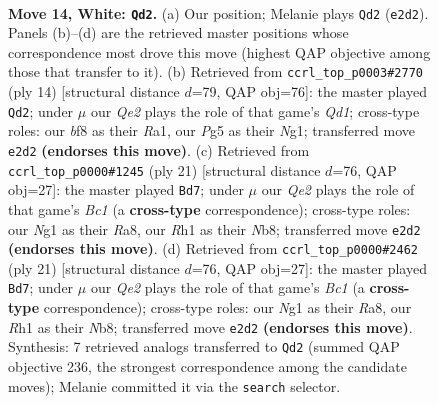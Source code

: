 \documentclass[11pt]{article}
\begin{document}
\clearpage

\begin{figure}[p]\centering
\begin{subfigure}{0.46\textwidth}\centering
\resizebox{\linewidth}{!}{%
\newchessgame
\chessboard[
  setfen={r1b1kb1r/pp1n1p2/4p3/3pP1Pp/3q4/8/PP2Q1PP/R1BK1NNR w kq - 1 14},
  showmover=false,
  pgfstyle=straightmove, color=movearrow, markmove={e2-d2}
]}
\caption{}
\end{subfigure}\hfill
\begin{subfigure}{0.46\textwidth}\centering
\resizebox{\linewidth}{!}{%
\newchessgame
\chessboard[
  setfen={rnb1kb1r/pp3pp1/4pn1p/q1P5/4N2B/8/PPP2PPP/R2QKBNR w KQkq - 1 8},
  showmover=false,
  pgfstyle=straightmove, color=movearrow, markmove={d1-d2}
]}
\caption{}
\end{subfigure}
\\[4pt]
\begin{subfigure}{0.46\textwidth}\centering
\resizebox{\linewidth}{!}{%
\newchessgame
\chessboard[
  setfen={rnb1k1r1/ppq1np1Q/4p3/3pP3/5P2/P1p5/2P1N1PP/R1B1KB1R b KQq - 0 11},
  showmover=false,
  pgfstyle=straightmove, color=movearrow, markmove={c8-d7}
]}
\caption{}
\end{subfigure}\hfill
\begin{subfigure}{0.46\textwidth}\centering
\resizebox{\linewidth}{!}{%
\newchessgame
\chessboard[
  setfen={rnb1k1r1/ppq1np1Q/4p3/3pP3/5P2/P1p5/2P1N1PP/R1B1KB1R b KQq - 0 11},
  showmover=false,
  pgfstyle=straightmove, color=movearrow, markmove={c8-d7}
]}
\caption{}
\end{subfigure}
\caption{\textbf{Move 14, White: \texttt{Qd2}.} (a) Our position; Melanie plays \texttt{Qd2} (\texttt{e2d2}). Panels (b)--(d) are the retrieved master positions whose correspondence most drove this move (highest QAP objective among those that transfer to it). (b) Retrieved from \texttt{ccrl\_top\_p0003\#2770} (ply 14) [structural distance $d$=79, QAP obj=76]: the master played \texttt{Qd2}; under $\mu$ our \emph{Qe2} plays the role of that game's \emph{Qd1}; cross-type roles: our \emph{b}f8 as their \emph{R}a1, our \emph{P}g5 as their \emph{N}g1; transferred move \texttt{e2d2} \textbf{(endorses this move)}. (c) Retrieved from \texttt{ccrl\_top\_p0000\#1245} (ply 21) [structural distance $d$=76, QAP obj=27]: the master played \texttt{Bd7}; under $\mu$ our \emph{Qe2} plays the role of that game's \emph{Bc1} (a \textbf{cross-type} correspondence); cross-type roles: our \emph{N}g1 as their \emph{R}a8, our \emph{R}h1 as their \emph{N}b8; transferred move \texttt{e2d2} \textbf{(endorses this move)}. (d) Retrieved from \texttt{ccrl\_top\_p0000\#2462} (ply 21) [structural distance $d$=76, QAP obj=27]: the master played \texttt{Bd7}; under $\mu$ our \emph{Qe2} plays the role of that game's \emph{Bc1} (a \textbf{cross-type} correspondence); cross-type roles: our \emph{N}g1 as their \emph{R}a8, our \emph{R}h1 as their \emph{N}b8; transferred move \texttt{e2d2} \textbf{(endorses this move)}. Synthesis: 7 retrieved analogs transferred to \texttt{Qd2} (summed QAP objective 236, the strongest correspondence among the candidate moves); Melanie committed it via the \texttt{search} selector.}
\label{fig:thought-m26}
\end{figure}
\end{document}
